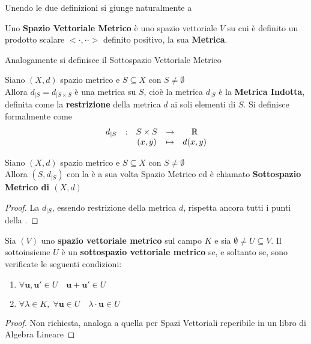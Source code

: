 Unendo le due definizioni si giunge naturalmente a
\begin{definition}
	\label{def:sp_vett_normato}
	Uno \textbf{Spazio Vettoriale Metrico} è uno spazio vettoriale $V$ su cui è definito un prodotto scalare $<\cdot,\cdot·>$ definito positivo, la sua \textbf{Metrica}.
	\begin{note}
		Analogamente si definisce il Sottospazio Vettoriale Metrico
	\end{note}
\end{definition}

\begin{definition}
	\label{def:metr_indotta}
	Siano $(X,d)$ spazio metrico e $S \subseteq X$ con $S \neq \emptyset$\\
	Allora $d_{|S} = d_{|S \times S}$ è una metrica su $S$, cioè la metrica $d_{|S}$ è la \textbf{Metrica Indotta}, definita come la \textbf{restrizione} della metrica $d$ ai soli elementi di $S$. Si definisce formalmente come
	\[\begin{array}{ccccc} {d_{|S}} & : & {S \times S} & \to & {\mathbb{R}} \\ & & {(x,y)} & \mapsto & {d(x,y)} \\ \end{array}\]
\end{definition}

\begin{definition}
	Siano $(X,d)$ spazio metrico e $S \subseteq X$ con $S \neq \emptyset$\\
	Allora $(S,d_{|S})$ con la  è a sua volta Spazio Metrico ed è chiamato \textbf{Sottospazio Metrico di $(X,d)$}
	\begin{proof}
		La $d_{|S}$, essendo restrizione della metrica $d$, rispetta ancora tutti i punti della .
	\end{proof}
\end{definition}

\begin{proposition}
	\label{prop:subspace_condition}
	Sia $(V)$ uno \textbf{spazio vettoriale metrico} sul campo $K$ e sia $\emptyset \neq U \subseteq V$. Il sottoinsieme $U$ è un \textbf{sottospazio vettoriale metrico} se, e soltanto se, sono verificate le seguenti condizioni:
	\begin{enumerate}
		\item $\forall \mathbf{u}, \mathbf{u'} \in U \quad \mathbf{u} + \mathbf{u'} \in U$
		\item $\forall \lambda \in K,\; \forall \mathbf{u} \in U \quad \lambda \cdot \mathbf{u} \in U$
	\end{enumerate}
	\begin{proof}
		Non richiesta, analoga a quella per Spazi Vettoriali reperibile in un libro di Algebra Lineare
	\end{proof}
\end{proposition}

